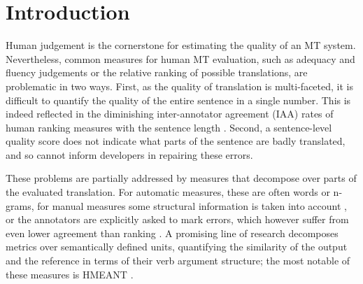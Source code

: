 \documentclass[11pt,letterpaper]{article}
\def\parcite#1{\cite{#1}}
\begin{document}
\begin{abstract}

\end{abstract}


\section{Introduction}\label{sec:intro}

Human judgement is the cornerstone for estimating the quality of an MT system.
Nevertheless, common measures for human MT evaluation, such as adequacy and fluency judgements
or the relative ranking of possible translations, are problematic in two ways.
First, as the quality of translation is multi-faceted, it is difficult
to quantify the quality of the entire sentence in a single number. This
is indeed reflected in the diminishing inter-annotator agreement (IAA) rates of human ranking measures
with the sentence length \cite{Bojar:2011}.
Second, a sentence-level quality score does not indicate what parts of the sentence
are badly translated, and so cannot inform developers in repairing these errors.

These problems are partially addressed by measures that decompose over parts of the evaluated
translation. For automatic measures,
these are often words or n-grams, for manual measures some structural
information is taken into account \parcite{machacek:bojar:segranks:2015}, or the
annotators are explicitly asked to mark errors, which however suffer from even
lower agreement than ranking \parcite{lommel:etal:mqm-iaa:2014}.
A promising line of research decomposes metrics
over semantically defined units,
quantifying the similarity of the output and the reference in terms of
their verb argument structure; the most notable of these measures is HMEANT
\parcite{lo2011structured}.
\end{document}
